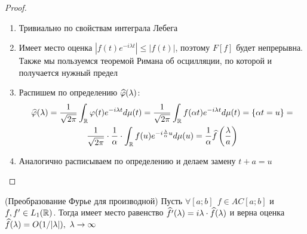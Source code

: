 \begin{proof}~
	\begin{enumerate}
		\item Тривиально по свойствам интеграла Лебега
		
		\item Имеет место оценка $|f(t)e^{-i\lambda t}| \le |f(t)|$, поэтому $F[f]$ будет непрерывна. Также мы пользуемся теоремой Римана об осцилляции, по которой и получается нужный предел
		
		\item Распишем по определению $\widehat{\varphi}(\lambda)$:
		\begin{multline*}
			\widehat{\varphi}(\lambda) = \frac{1}{\sqrt{2\pi}} \int_{\mathbb{R}} \varphi(t)e^{-i\lambda t}d\mu(t) = \frac{1}{\sqrt{2\pi}} \int_{\mathbb{R}} f(\alpha t) e^{-i\lambda t}d\mu(t) = \{\alpha t = u\} =
			\\
			\frac{1}{\sqrt{2\pi}} \cdot \frac{1}{\alpha} \cdot \int_{\mathbb{R}} f(u)e^{-i \frac{\lambda}{\alpha}u}d\mu(u) = \frac{1}{\alpha} \widehat{f}\left(\frac{\lambda}{a}\right)
		\end{multline*}
		
		\item Аналогично расписываем по определению и делаем замену $t + a = u$
	\end{enumerate}
\end{proof}

\begin{theorem} (Преобразование Фурье для производной)
	Пусть $\forall [a; b]\ \ f \in AC[a; b]$ и $f, f' \in L_1(\mathbb{R})$. Тогда имеет место равенство $\widehat{f'}(\lambda) = i\lambda \cdot \widehat{f}(\lambda)$ и верна оценка $\widehat{f}(\lambda) = O(1 / |\lambda|),\ \lambda \to \infty$
\end{theorem}

